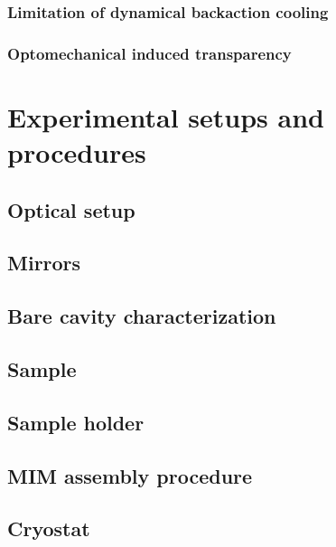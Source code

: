 \documentclass[12pt,twoside]{report}
\begin{document}
\subsection{Limitation of dynamical backaction cooling}


\subsection{Optomechanical induced transparency}


\chapter{Experimental setups and procedures}

\section{Optical setup}


\section{Mirrors}


\section{Bare cavity characterization}


\section{Sample}


\section{Sample holder}


\section{MIM assembly procedure}


\section{Cryostat}

\end{document}
